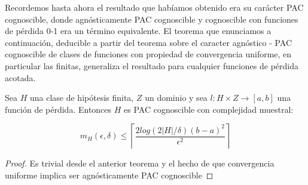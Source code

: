 Recordemos hasta ahora el resultado que habíamos obtenido era su carácter PAC cognoscible, donde 
agnósticamente PAC cognoscible y cognoscible con funciones de pérdida 0-1 era un término equivalente. El 
teorema que enunciamos a continuación, deducible a partir del teorema sobre el caracter agnóstico - PAC 
cognoscible de clases de funciones con propiedad de convergencia uniforme, en particular las finitas, 
generaliza el resultado para cualquier funciones de pérdida acotada.

\begin{theorem*}

Sea $H$ una clase de hipótesis finita, $Z$ un dominio y sea $l : H \times Z \rightarrow [a,b]$ una función de pérdida. Entonces $H$ es PAC cognoscible con complejidad muestral:

\[m_{H}( \epsilon, \delta ) \le \left\lceil \frac{2 log(2|H|/\delta)(b-a)^2}{\epsilon^2} \right\rceil\]
\end{theorem*}
  \begin{proof}
  Es trivial desde el anterior teorema y el hecho de que convergencia uniforme implica ser agnósticamente PAC cognoscible
  \end{proof}
